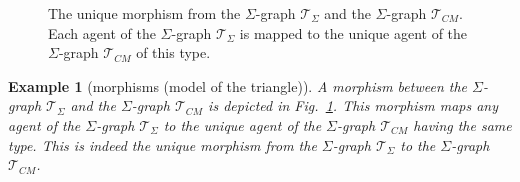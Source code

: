 \documentclass{entcs}
\newcommand{\graphsymb}{G}
\newtheorem{myexample}[thm]{Example}
\begin{document}
\begin{figure}[t]
\hfill{}\hfill\mbox{}
\caption{The unique morphism from the $\Sigma$-graph $\mathcal{T}_{\Sigma}$
and the $\Sigma$-graph $\mathcal{T}_{\textit{CM}}$. Each agent of the $\Sigma$-graph $\mathcal{T}_{\Sigma}$ is mapped to the unique agent of the $\Sigma$-graph $\mathcal{T}_{\textit{CM}}$ of this type.}
\label{fig:abc:embed}
\end{figure}
\begin{myexample}[morphisms (model of the triangle)]
  \renewcommand{\graphsymb}{\mathcal{T}}
A morphism between the $\Sigma$-graph $\graphsymb_{\Sigma}$ and the $\Sigma$-graph $\graphsymb_{\textit{CM}}$ is depicted in Fig.~\ref{fig:abc:embed}. This morphism maps any agent of the $\Sigma$-graph
$\graphsymb_{\Sigma}$ to the unique agent of the $\Sigma$-graph $\graphsymb_{\textit{CM}}$ having the same type.
This is indeed the unique morphism from the  $\Sigma$-graph
$\graphsymb_{\Sigma}$ to the $\Sigma$-graph $\graphsymb_{\textit{CM}}$.
\end{myexample}
\end{document}
